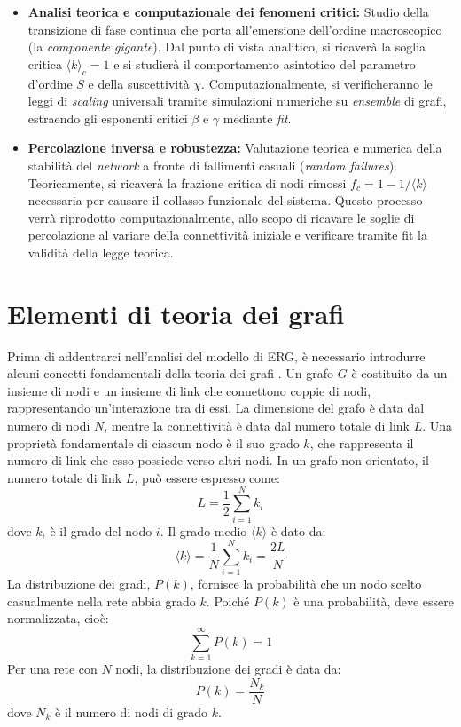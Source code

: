 \documentclass[12pt,italian]{article}
\begin{document}
\begin{itemize}
    \item \textbf{Analisi teorica e computazionale dei fenomeni critici:} Studio della transizione di fase continua che porta all'emersione dell'ordine macroscopico (la \emph{componente gigante}). Dal punto di vista analitico, si ricaverà la soglia critica $\langle k \rangle_c = 1$ e si studierà il comportamento asintotico del parametro d'ordine $S$ e della suscettività $\chi$. Computazionalmente, si verificheranno le leggi di \emph{scaling} universali tramite simulazioni numeriche su \emph{ensemble} di grafi, estraendo gli esponenti critici $\beta$ e $\gamma$ mediante \emph{fit}.

    \item \textbf{Percolazione inversa e robustezza:} Valutazione teorica e numerica della stabilità del \emph{network} a fronte di fallimenti casuali (\emph{random failures}). Teoricamente, si ricaverà la frazione critica di nodi rimossi $f_c = 1 - 1/\langle k \rangle$ necessaria per causare il collasso funzionale del sistema. Questo processo verrà riprodotto computazionalmente, allo scopo di ricavare le soglie di percolazione al variare della connettività iniziale e verificare tramite fit la validità della legge teorica.
\end{itemize}

\section{Elementi di teoria dei grafi}
Prima di addentrarci nell'analisi del modello di ERG, è necessario introdurre alcuni concetti fondamentali della teoria dei grafi \cite{barabasi2016network}. Un grafo $G$ è costituito da un insieme di nodi e un insieme di link che connettono coppie di nodi, rappresentando un'interazione tra di essi. La dimensione del grafo è data dal numero di nodi $N$, mentre la connettività è data dal numero totale di link $L$.
Una proprietà fondamentale di ciascun nodo è il suo grado $k$, che rappresenta il numero di link che esso possiede verso altri nodi.
In un grafo non orientato, il numero totale di link $L$, può essere espresso come:
\begin{equation}
    L = \frac{1}{2} \sum_{i=1}^{N} k_i
\end{equation}
dove $k_i$ è il grado del nodo $i$. Il grado medio $\langle k \rangle$ è dato da:
\begin{equation}
    \langle k \rangle = \frac{1}{N} \sum_{i=1}^{N} k_i = \frac{2L}{N}
    \label{eq:grado_medio}
\end{equation}
La distribuzione dei gradi, $P(k)$, fornisce la probabilità che un nodo scelto casualmente nella rete abbia grado $k$. Poiché $P(k)$ è una probabilità, deve essere normalizzata, cioè:
\begin{equation}
    \sum_{k=1}^{\infty} P(k) = 1
\end{equation}
Per una rete con $N$ nodi, la distribuzione dei gradi è data da:
\begin{equation}
    P(k) = \frac{N_k}{N}
\end{equation}
dove $N_k$ è il numero di nodi di grado $k$.
\end{document}
